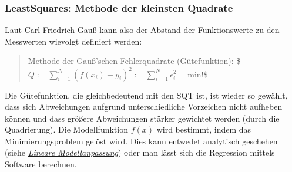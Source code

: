 \documentclass[letterpaper,10pt,english]{jupyterBook}
\begin{document}
\subsubsection{Least\sphinxhyphen{}Squares: Methode der kleinsten Quadrate }
\label{\detokenize{content/1_Kurvenanpassung:least-squares-methode-der-kleinsten-quadrate-a-id-subsec-least-squares-a}}
\sphinxAtStartPar
Laut Carl Friedrich Gauß kann also der Abstand der Funktionswerte zu den Messwerten wievolgt definiert werden:
\begin{quote}

\sphinxAtStartPar
Methode der Gauß’schen Fehlerquadrate (Gütefunktion):
\$\(Q := \sum_{i=1}^N \left( f(x_i) - y_i\right)^2 :=  \sum_{i=1}^N \epsilon_i^2 = \mathrm{min!}\)\$
\end{quote}

\sphinxAtStartPar
Die Gütefunktion, die gleichbedeutend mit den SQT ist, ist wieder so gewählt, dass sich Abweichungen aufgrund unterschiedliche Vorzeichen nicht aufheben können und dass größere Abweichungen stärker gewichtet werden (durch die Quadrierung). Die Modellfunktion \(f(x)\) wird bestimmt, indem das Minimierungsproblem gelöst wird. Dies kann entwedet analytisch geschehen (siehe {\hyperref[\detokenize{content/1_Kurvenanpassung:SubSec-Lineare_Modellanpassung}]{\emph{Lineare Modellanpassung}}}) oder man lässt sich die Regression mittels Software berechnen.
\end{document}
